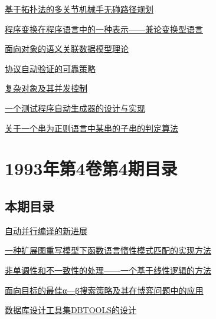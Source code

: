 \documentclass[a4paper]{article}
\begin{document}
\href{http://www.jos.org.cn/ch/reader/download_pdf.aspx?file_no=19930503&year_id=1993&quarter_id=5&falg=1}{基于拓扑法的多关节机械手无碰路径规划}

\href{http://www.jos.org.cn/ch/reader/download_pdf.aspx?file_no=19930504&year_id=1993&quarter_id=5&falg=1}{程序变换在程序语言中的一种表示——兼论变换型语言}

\href{http://www.jos.org.cn/ch/reader/download_pdf.aspx?file_no=19930505&year_id=1993&quarter_id=5&falg=1}{面向对象的语义关联数据模型理论}

\href{http://www.jos.org.cn/ch/reader/download_pdf.aspx?file_no=19930506&year_id=1993&quarter_id=5&falg=1}{协议自动验证的可靠策略}

\href{http://www.jos.org.cn/ch/reader/download_pdf.aspx?file_no=19930507&year_id=1993&quarter_id=5&falg=1}{复杂对象及其并发控制}

\href{http://www.jos.org.cn/ch/reader/download_pdf.aspx?file_no=19930509&year_id=1993&quarter_id=5&falg=1}{一个测试程序自动生成器的设计与实现}

\href{http://www.jos.org.cn/ch/reader/download_pdf.aspx?file_no=19930510&year_id=1993&quarter_id=5&falg=1}{关于一个串为正则语言中某串的子串的判定算法}


\section{\textbf{1993年第4卷第4期目录}}
\subsection{本期目录}
\href{http://www.jos.org.cn/ch/reader/download_pdf.aspx?file_no=19930401&year_id=1993&quarter_id=4&falg=1}{自动并行编译的新进展}

\href{http://www.jos.org.cn/ch/reader/download_pdf.aspx?file_no=19930402&year_id=1993&quarter_id=4&falg=1}{一种扩展图重写模型下函数语言惰性模式匹配的实现方法}

\href{http://www.jos.org.cn/ch/reader/download_pdf.aspx?file_no=19930403&year_id=1993&quarter_id=4&falg=1}{非单调性和不一致性的处理——一个基于线性逻辑的方法}

\href{http://www.jos.org.cn/ch/reader/download_pdf.aspx?file_no=19930404&year_id=1993&quarter_id=4&falg=1}{面向目标的最佳α—β搜索策略及其在博弈问题中的应用}

\href{http://www.jos.org.cn/ch/reader/download_pdf.aspx?file_no=19930405&year_id=1993&quarter_id=4&falg=1}{数据库设计工具集DBTOOLS的设计}
\end{document}
